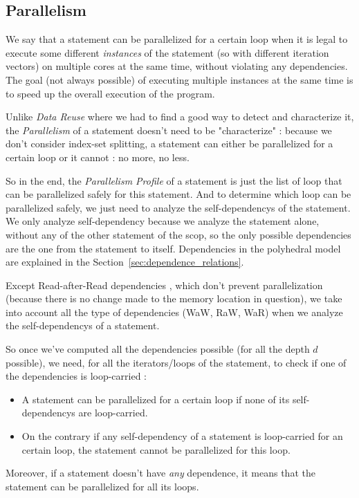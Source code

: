 \documentclass[paper=a4, fontsize=11.5pt]{scrartcl}
\numberwithin{equation}{section}        %
\numberwithin{figure}{section}          %
\numberwithin{table}{section}               %
\begin{document}
    \subsection{Parallelism}
        We say that a statement can be parallelized for a certain loop when it is legal to
        execute some different \textit{instances} of the statement (so with different iteration vectors)
        on multiple cores at the same time, without violating any dependencies. The
        goal (not always possible) of executing multiple instances at the same time is to
        speed up the overall execution of the program.

        Unlike \textit{Data Reuse} where we had to find a good way to detect and characterize it,
        the \textit{Parallelism} of a statement doesn't need to be "characterize" :
        because we don't consider index-set splitting, a statement can either be
        parallelized for a certain loop or it cannot : no more, no less.

        So in the end, the \textit{Parallelism Profile} of a statement is just the list
        of loop that can be parallelized safely for this statement.
        And to determine which loop can be parallelized safely, we just need to analyze
        the \glspl{self-dependency} of the statement. We only analyze \gls{self-dependency}
        because we analyze the statement alone, without any of the other statement of
        the scop, so the only possible dependencies are the one from the statement to itself.
        Dependencies in the polyhedral model are explained in the Section~\ref{sec:dependence_relations}.
       
        \bigskip

        Except Read-after-Read dependencies , which don't prevent parallelization (because there is no
        change made to the memory location in question), we take into account all the type
        of dependencies (WaW, RaW, WaR) when we analyze the \glspl{self-dependency} of a statement.

        \medskip
        
        So once we've computed all the dependencies possible (for all the depth $d$ possible),
        we need, for all the iterators/loops of the statement, to check if one of the dependencies
        is loop-carried :
        \begin{itemize}
            \item A statement can be parallelized for a certain loop if none of its \glspl{self-dependency}
                are loop-carried.
            \item On the contrary if any \gls{self-dependency} of a statement is loop-carried for an certain loop,
                the statement cannot be parallelized for this loop.
        \end{itemize}
        Moreover, if a statement doesn't have \textit{any} dependence, it means that the
        statement can be parallelized for all its loops.
\end{document}
